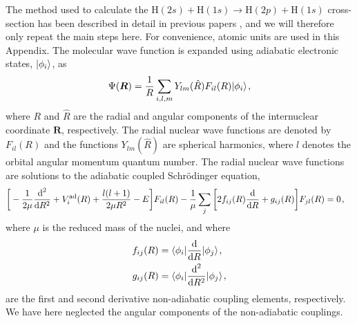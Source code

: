 \documentclass[fleqn,usenatbib]{mnras}
\DeclarePairedDelimiter\bra{\langle}{\rvert}
\DeclarePairedDelimiter\ket{\lvert}{\rangle}
\begin{document}
The method used to calculate the $\textrm{H}(2s)+\textrm{H}(1s) \rightarrow \textrm{H}(2p)+\textrm{H}(1s)$ cross-section has been described in detail in previous papers \citep[see e.g.][]{stenrup2009,hornquist2022}, and we will therefore only repeat the main steps here. For convenience, atomic units are used in this Appendix. The molecular wave function is expanded using adiabatic electronic states, $\ket{\phi_i}$, as
\begin{align}
\Psi(\boldsymbol{R}) = \dfrac{1}{R}\sum_{i,l,m}Y_{lm}(\hat{R})F_{il}(R)\ket{\phi_i} \hspace{1 pt},
\end{align}
where $R$ and $\hat{R}$ are the radial and angular components of the internuclear coordinate $\boldsymbol{R}$, respectively. The radial nuclear wave functions are denoted by $F_{il}(R)$ and the functions $Y_{lm}(\hat{R})$ are spherical harmonics, where $l$ denotes the orbital angular momentum quantum number. The radial nuclear wave functions are solutions to the adiabatic coupled Schrödinger equation,
\begin{align}
&\bigg[-\dfrac{1}{2\mu}\dfrac{ \textrm{d}^2}{\textrm{d} R^2}+V^{\rm ad}_i(R)+\dfrac{l(l+1)}{2\mu R^2}-E\bigg]F_{il}(R) - \dfrac{1}{\mu}\sum_j\bigg[2f_{ij}(R)\dfrac{\textrm{d}}{\textrm{d}R}+g_{ij}(R)\bigg]F_{jl}(R)=0 \hspace{1 pt},
\end{align}
where $\mu$ is the reduced mass of the nuclei, and where
\begin{align}
f_{ij}(R) &= \bra{\phi_i}\dfrac{\textrm{d}}{\textrm{d}R}\ket{\phi_j} \hspace{1 pt},\\
g_{ij}(R) &= \bra{\phi_i}\dfrac{\textrm{d}^2}{\textrm{d}R^2}\ket{\phi_j} \hspace{1 pt},
\end{align}
are the first and second derivative non-adiabatic coupling elements, respectively. We have here neglected the angular components of the non-adiabatic couplings. 
\end{document}
